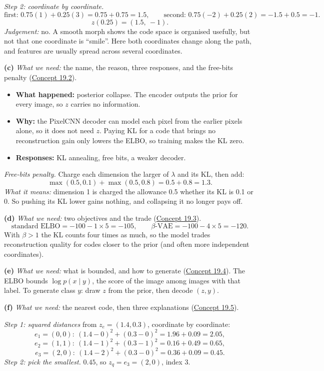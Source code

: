 \documentclass[12pt,a4paper]{article}
\begin{document}
\emph{Step 2: coordinate by coordinate.}
\[
\text{first: }0.75(1)+0.25(3)=0.75+0.75=1.5,\qquad \text{second: }0.75(-2)+0.25(2)=-1.5+0.5=-1 .
\]
\[
z(0.25)=(1.5,\ -1).
\]
\emph{Judgement:} no. A smooth morph shows the code space is organised usefully, but not that one coordinate is ``smile''. Here both coordinates change along the path, and features are usually spread across several coordinates.

\textbf{(c)} \emph{What we need:} the name, the reason, three responses, and the free-bits penalty (\hyperref[c19-2]{Concept 19.2}).
\begin{itemize}[nosep]
  \item \textbf{What happened:} posterior collapse. The encoder outputs the prior for every image, so $z$ carries no information.
  \item \textbf{Why:} the PixelCNN decoder can model each pixel from the earlier pixels alone, so it does not need $z$. Paying KL for a code that brings no reconstruction gain only lowers the ELBO, so training makes the KL zero.
  \item \textbf{Responses:} KL annealing, free bits, a weaker decoder.
\end{itemize}
\emph{Free-bits penalty.} Charge each dimension the larger of $\lambda$ and its KL, then add:
\[
\max(0.5,0.1)+\max(0.5,0.8)=0.5+0.8=1.3 .
\]
\emph{What it means:} dimension 1 is charged the allowance 0.5 whether its KL is 0.1 or 0. So pushing its KL lower gains nothing, and collapsing it no longer pays off.

\textbf{(d)} \emph{What we need:} two objectives and the trade (\hyperref[c19-3]{Concept 19.3}).
\[
\text{standard ELBO}=-100-1\times5=-105,\qquad \beta\text{-VAE}=-100-4\times5=-120 .
\]
With $\beta>1$ the KL counts four times as much, so the model trades reconstruction quality for codes closer to the prior (and often more independent coordinates).

\textbf{(e)} \emph{What we need:} what is bounded, and how to generate (\hyperref[c19-4]{Concept 19.4}). The ELBO bounds $\log p(x\mid y)$, the score of the image among images with that label. To generate class $y$: draw $z$ from the prior, then decode $(z,y)$.

\textbf{(f)} \emph{What we need:} the nearest code, then three explanations (\hyperref[c19-5]{Concept 19.5}).

\emph{Step 1: squared distances} from $z_e=(1.4,0.3)$, coordinate by coordinate:
\[
e_1=(0,0):\ (1.4-0)^2+(0.3-0)^2=1.96+0.09=2.05,
\]
\[
e_2=(1,1):\ (1.4-1)^2+(0.3-1)^2=0.16+0.49=0.65,
\]
\[
e_3=(2,0):\ (1.4-2)^2+(0.3-0)^2=0.36+0.09=0.45 .
\]
\emph{Step 2: pick the smallest.} $0.45$, so $z_q=e_3=(2,0)$, index 3.
\end{document}
